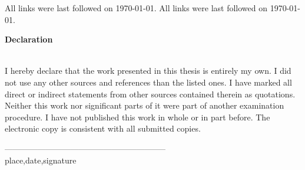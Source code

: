 \documentclass[
               fontsize=12pt, %
               paper=a4,
               twoside, %
               BCOR=3mm, %
               DIV=13,   %
               headinclude=true,
               footinclude=false,
               bibliography=totoc,
               headsepline,
               cleardoublepage=empty,
               parskip=half,
               pointlessnumbers, %
               final   %
               ]{scrbook}
\let\ifdeutsch\iffalse
\begin{document}

\printbibliography

\ifdeutsch
All links were last followed on \today.
\else
All links were last followed on \today.
\fi

\pagestyle{empty}
\renewcommand*{\chapterpagestyle}{empty}
\pagestyle{empty}
\vspace{9cm}
\begin{center}
	\begin{minipage}{11cm}
		\vspace{6cm}
		
		\textbf{\Large Declaration}\\\\
		\vspace{0.4cm}
		
		I hereby declare that the work presented in this thesis is entirely my own. 
		I did not use any other sources and references than the listed ones. I have marked all direct or indirect statements from other sources contained therein as quotations. 
		Neither this work nor significant parts of it were part of another examination procedure. I have not published this work in whole or in part before. 
		The electronic copy is consistent with all submitted copies.
		\vspace{1cm}
		
		
		
		
\hspace{2.1cm}-----------------------------------------------------------\\
\vspace{1cm} \hspace{2.1cm} place,date,signature
	\end{minipage}
\end{center}
\end{document}
